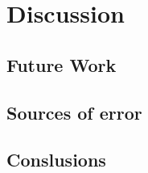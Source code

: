 \chapter{Discussion}

\section{Future Work}


\section{Sources of error}

\section{Conslusions}






